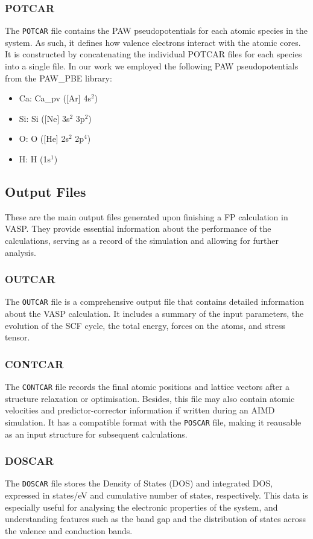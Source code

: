 \subsubsection{POTCAR}
The \texttt{POTCAR} file contains the PAW pseudopotentials for each atomic species in the system. As such, it defines how valence electrons interact with the atomic cores. It is constructed by concatenating the individual POTCAR files for each species into a single file. In our work we employed the following PAW pseudopotentials from the PAW\_PBE library:
\begin{itemize}
    \item Ca: Ca\_pv ([Ar] 4s$^2$)
    \item Si: Si ([Ne] 3s$^2$ 3p$^2$)
    \item O: O ([He] 2s$^2$ 2p$^4$)
    \item H: H (1s$^1$)
\end{itemize}

\subsection{Output Files}
These are the main output files generated upon finishing a FP calculation in VASP. They provide essential information about the performance of the calculations, serving as a record of the simulation and allowing for further analysis.
\subsubsection{OUTCAR}
The \texttt{OUTCAR} file is a comprehensive output file that contains detailed information about the VASP calculation. It includes a summary of the input parameters, the evolution of the SCF cycle, the total energy, forces on the atoms, and stress tensor.
\subsubsection{CONTCAR}
The \texttt{CONTCAR} file records the final atomic positions and lattice vectors after a structure relaxation or optimisation. Besides, this file may also contain atomic velocities and predictor-corrector information if written during an AIMD simulation. It has a compatible format with the \texttt{POSCAR} file, making it reausable as an input structure for subsequent calculations.

\subsubsection{DOSCAR}
The \texttt{DOSCAR} file stores the Density of States (DOS) and integrated DOS, expressed in states/eV and cumulative number of states, respectively. This data is especially useful for analysing the electronic properties of the system, and understanding features such as the band gap and the distribution of states across the valence and conduction bands. 
